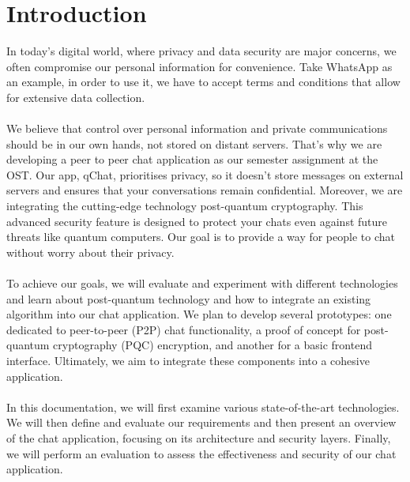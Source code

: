 \chapter{Introduction}
In today's digital world, where privacy and data security are major concerns, we often compromise our personal information for convenience. Take WhatsApp as an example, in order to use it, we have to accept terms and conditions that allow for extensive data collection.\\ \\
We believe that control over personal information and private communications should be in our own hands, not stored on distant servers. That's why we are developing a peer to peer chat application as our semester assignment at the OST. Our app, qChat, prioritises privacy, so it doesn't store messages on external servers and ensures that your conversations remain confidential. Moreover, we are integrating the cutting-edge technology post-quantum cryptography. This advanced security feature is designed to protect your chats even against future threats like quantum computers. Our goal is to provide a way for people to chat without worry about their privacy.\\ \\
To achieve our goals, we will evaluate and experiment with different technologies and learn about post-quantum technology and how to integrate an existing algorithm into our chat application. We plan to develop several prototypes: one dedicated to peer-to-peer (P2P) chat functionality, a proof of concept for post-quantum cryptography (PQC) encryption, and another for a basic frontend interface. Ultimately, we aim to integrate these components into a cohesive application.\\ \\
In this documentation, we will first examine various state-of-the-art technologies. We will then define and evaluate our requirements and then present an overview of the chat application, focusing on its architecture and security layers. Finally, we will perform an evaluation to assess the effectiveness and security of our chat application.
